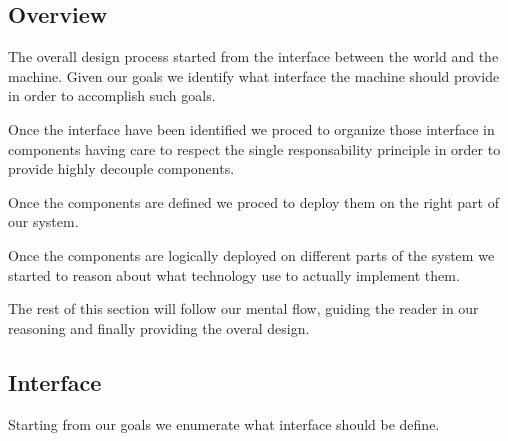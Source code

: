 \documentclass[11pt]{article} %
\begin{document}
\subsection{Overview}

The overall design process started from the interface between the world and the machine. Given our goals we identify what interface the machine should provide in order to accomplish such goals.

Once the interface have been identified we proced to organize those interface in components having care to respect the single responsability principle in order to provide highly decouple components.

Once the components are defined we proced to deploy them on the right part of our system.

Once the components are logically deployed on different parts of the system we started to reason about what technology use to actually implement them.

The rest of this section will follow our mental flow, guiding the reader in our reasoning and finally providing the overal design.

\subsection{Interface}

Starting from our goals we enumerate what interface should be define.
\end{document}
